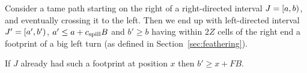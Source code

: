 \documentclass[11pt]{memoir}
\theoremstyle{definition} %
\renewcommand{\le}{\leq}
\renewcommand{\ge}{\geq}
\def\B{B}
\newcommand{\E}{E} %
\newcommand{\F}{F}
\newcommand{\Z}{Z} %
\newcommand{\cns}[1]{c_{\textrm{\upshape #1}}}
\newcommand{\CSpill}{\cns{spill}}
\begin{document}
\begin{lemma}\label{lem:keep-directed}
  Consider a tame path starting on the right of a right-directed interval
  \( J = \left[a,b\right) \), and eventually crossing it to the left.
  Then we end up with left-directed interval \( J' = \left[a',b'\right) \),
  \( a'\le a+\CSpill\B \) and \( b'\ge b \) having within \( 2\Z \) cells of the right end
  a footprint of a big left turn (as defined in Section~\ref{sec:feathering}).

   If \( J \) already had such a footprint at position \( x \) then \( b'\ge x+\F\B \).
\end{lemma}
\end{document}
